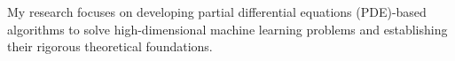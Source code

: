 

\begin{cvparagraph}


My research focuses on developing partial differential equations (PDE)-based algorithms to solve high-dimensional machine learning problems and establishing their rigorous theoretical foundations.
\end{cvparagraph}
